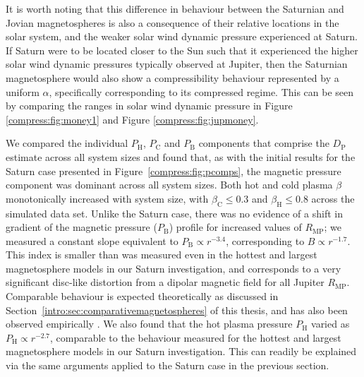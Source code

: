 It is worth noting that this difference in behaviour between the Saturnian and Jovian magnetospheres is also a consequence of their relative locations in the solar system, and the weaker solar wind dynamic pressure experienced at Saturn. If Saturn were to be located closer to the Sun such that it experienced the higher solar wind dynamic pressures typically observed at Jupiter, then the Saturnian magnetosphere would also show a compressibility behaviour represented by a uniform $\alpha$, specifically corresponding to its compressed regime. This can be seen by comparing the ranges in solar wind dynamic pressure in Figure \ref{compress:fig:money1} and Figure \ref{compress:fig:jupmoney}.

We compared the individual $P_\mathrm{H}$, $P_\mathrm{C}$ and $P_\mathrm{B}$ components that comprise the $D_\mathrm{P}$ estimate across all system sizes and found that, as with the initial results for the Saturn case presented in Figure~\ref{compress:fig:pcomps}, the magnetic pressure component was dominant across all system sizes. Both hot and cold plasma $\beta$ monotonically increased with system size, with $\beta_\mathrm{C} \leq 0.3$ and $\beta_\mathrm{H} \leq 0.8$ across the simulated data set. Unlike the Saturn case, there was no evidence of a shift in gradient of the magnetic pressure ($P_\mathrm{B}$) profile for increased values of $R_\mathrm{MP}$; we measured a constant slope equivalent to $P_\mathrm{B}\propto r^{-3.4}$, corresponding to $B\propto r^{-1.7}$. This index is smaller than was measured even in the hottest and largest magnetosphere models in our Saturn investigation, and corresponds to a very significant disc-like distortion from a dipolar magnetic field for all Jupiter $R_\mathrm{MP}$. Comparable behaviour is expected theoretically as discussed in Section~\ref{intro:sec:comparativemagnetospheres} of this thesis, and has also been observed empirically \cite[e.g.][]{khurana1989}. We also found that the hot plasma pressure $P_\mathrm{H}$ varied as $P_\mathrm{H} \propto r^{-2.7}$, comparable to the behaviour measured for the hottest and largest magnetosphere models in our Saturn investigation. This can readily be explained via the same arguments applied to the Saturn case in the previous section.

